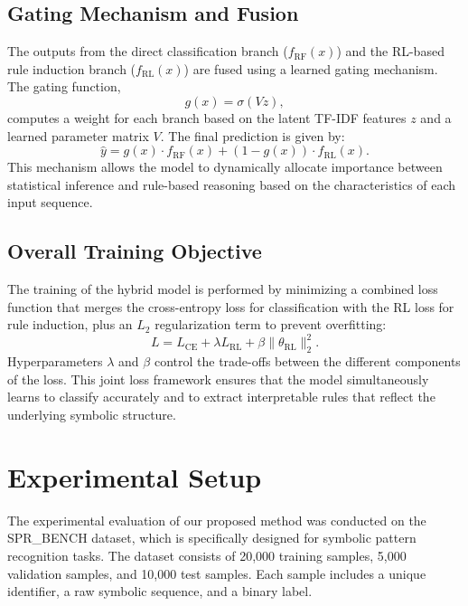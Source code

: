 \documentclass{article}
\begin{document}
\subsection{Gating Mechanism and Fusion}
The outputs from the direct classification branch (\(f_{\mathrm{RF}}(x)\)) and the RL-based rule induction branch (\(f_{\mathrm{RL}}(x)\)) are fused using a learned gating mechanism. The gating function,
\[
g(x) = \sigma(Vz),
\]
computes a weight for each branch based on the latent TF-IDF features \(z\) and a learned parameter matrix \(V\). The final prediction is given by:
\[
\hat{y} = g(x) \cdot f_{\mathrm{RF}}(x) + (1-g(x)) \cdot f_{\mathrm{RL}}(x).
\]
This mechanism allows the model to dynamically allocate importance between statistical inference and rule-based reasoning based on the characteristics of each input sequence.

\subsection{Overall Training Objective}
The training of the hybrid model is performed by minimizing a combined loss function that merges the cross-entropy loss for classification with the RL loss for rule induction, plus an \(L_2\) regularization term to prevent overfitting:
\[
L = L_{\mathrm{CE}} + \lambda L_{\mathrm{RL}} + \beta \| \theta_{\mathrm{RL}} \|_2^2.
\]
Hyperparameters \(\lambda\) and \(\beta\) control the trade-offs between the different components of the loss. This joint loss framework ensures that the model simultaneously learns to classify accurately and to extract interpretable rules that reflect the underlying symbolic structure.

\section{Experimental Setup}
The experimental evaluation of our proposed method was conducted on the SPR\_BENCH dataset, which is specifically designed for symbolic pattern recognition tasks. The dataset consists of 20,000 training samples, 5,000 validation samples, and 10,000 test samples. Each sample includes a unique identifier, a raw symbolic sequence, and a binary label.
\end{document}
